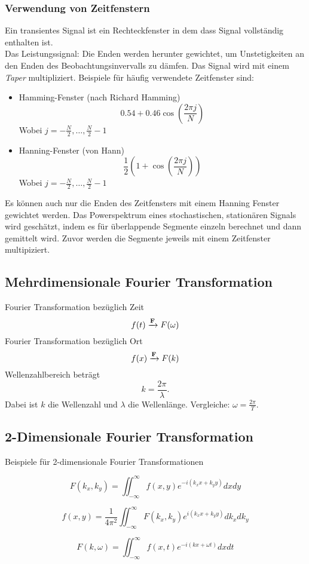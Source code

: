 \subsubsection*{Verwendung von Zeitfenstern}
Ein transientes Signal ist ein Rechteckfenster in dem dass Signal vollständig enthalten ist.\\
Das Leistungssignal: Die Enden werden herunter gewichtet, um Unstetigkeiten an den Enden des Beobachtungsinvervalls zu dämfen. Das Signal wird mit einem \textit{Taper} multipliziert. Beispiele für häufig verwendete Zeitfenster sind:
\begin{itemize}
\item Hamming-Fenster (nach Richard Hamming)
\[
0.54+0.46\cos \left(\frac{2\pi j}{N} \right)
\]
{\small Wobei $j=-\frac{N}{2},\dots, \frac{N}{2}-1$}
\item Hanning-Fenster (von Hann)
\[
\frac{1}{2}\left(1+\cos\left(\frac{2\pi j}{N}\right)\right)
\]
{\small Wobei $j=-\frac{N}{2},\dots, \frac{N}{2}-1$}
\end{itemize}
Es können auch nur die Enden des Zeitfensters mit einem Hanning Fenster gewichtet werden.
Das Powerspektrum eines stochastischen, stationären Signals wird geschätzt, indem es für überlappende Segmente einzeln berechnet und dann gemittelt wird. Zuvor werden die Segmente jeweils mit einem Zeitfenster multipiziert.

\subsection{Mehrdimensionale Fourier Transformation}
Fourier Transformation bezüglich Zeit
\[
f(t) \xrightarrow {\bf F} F(\omega)
\]
Fourier Transformation bezüglich Ort
\[
f(x) \xrightarrow {\bf F} F(k)
\]
Wellenzahlbereich beträgt 
\[
k=\frac{2\pi}{\lambda}.
\]
{\small Dabei ist $k$ die Wellenzahl und $\lambda$ die Wellenlänge.}
Vergleiche: $ \omega =\frac{2\pi}{T}$.

\subsection{2-Dimensionale Fourier Transformation}
Beispiele für 2-dimensionale Fourier Transformationen

\[
F(k_x,k_y)=\iint_{-\infty}^\infty f(x,y)e^{-i(k_xx+k_yy)} dx dy
\]

\[
f(x,y)=\frac{1}{4\pi^2} \iint_{-\infty}^\infty F(k_x,k_y)e^{i(k_xx+k_yy)} dk_x dk_y
\]

\[
F(k,\omega)=\iint_{-\infty}^\infty f(x,t)e^{-i(kx+\omega t)} dx dt
\]

